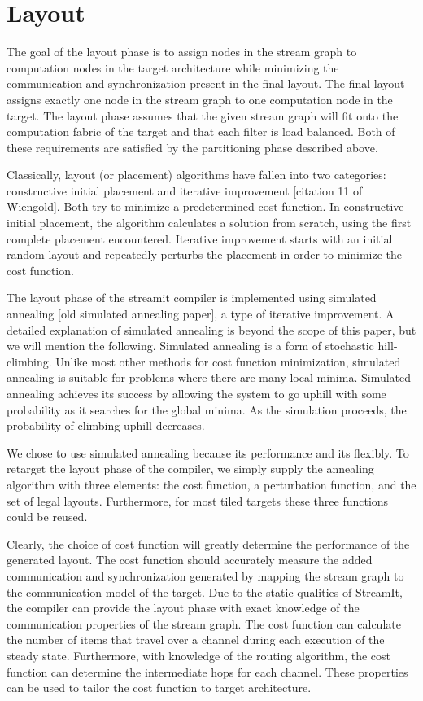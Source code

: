 \section{Layout}
\label{sec:layout}

The goal of the layout phase is to assign nodes in the stream graph to
computation nodes in the target architecture while minimizing the
communication and synchronization present in the final layout.  The
final layout assigns exactly one node in the stream graph to one
computation node in the target.  The layout phase assumes that the
given stream graph will fit onto the computation fabric of the target
and that each filter is load balanced.  Both of these requirements are
satisfied by the partitioning phase described above.

Classically, layout (or placement) algorithms have fallen into two
categories: constructive initial placement and iterative improvement
[citation 11 of Wiengold].  Both try to minimize a predetermined cost
function.  In constructive initial placement, the algorithm calculates
a solution from scratch, using the first complete placement
encountered.  Iterative improvement starts with an initial random
layout and repeatedly perturbs the placement in order to minimize the
cost function.

The layout phase of the streamit compiler is implemented using
simulated annealing [old simulated annealing paper], a type of
iterative improvement.  A detailed explanation of simulated annealing
is beyond the scope of this paper, but we will mention the following.
Simulated annealing is a form of stochastic hill-climbing. Unlike most
other methods for cost function minimization, simulated annealing is
suitable for problems where there are many local minima.  Simulated
annealing achieves its success by allowing the system to go uphill
with some probability as it searches for the global minima.  As the
simulation proceeds, the probability of climbing uphill decreases.
  
We chose to use simulated annealing because its performance and its
flexibly.  To retarget the layout phase of the compiler, we simply
supply the annealing algorithm with three elements: the cost function,
a perturbation function, and the set of legal layouts.  Furthermore,
for most tiled targets these three functions could be reused.

Clearly, the choice of cost function will greatly determine the
performance of the generated layout.  The cost function should
accurately measure the added communication and synchronization
generated by mapping the stream graph to the communication model of
the target.  Due to the static qualities of StreamIt, the compiler can
provide the layout phase with exact knowledge of the communication
properties of the stream graph.  The cost function can calculate the
number of items that travel over a channel during each execution of
the steady state.  Furthermore, with knowledge of the routing
algorithm, the cost function can determine the intermediate hops for
each channel.  These properties can be used to tailor the cost
function to target architecture.

